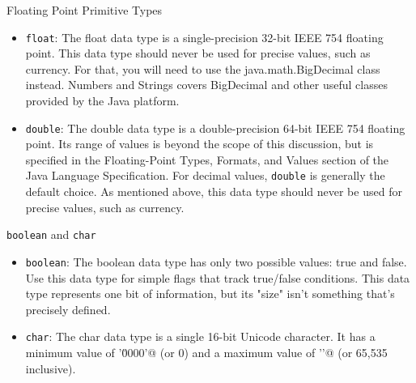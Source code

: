 \documentclass{beamer}
\begin{document}
\begin{frame}[fragile]{Floating Point Primitive Types}


\begin{itemize}
\item {\tt float}: The float data type is a single-precision 32-bit IEEE 754 floating point. This data type should never be used for precise values, such as currency. For that, you will need to use the java.math.BigDecimal class instead. Numbers and Strings covers BigDecimal and other useful classes provided by the Java platform.

\item {\tt double}: The double data type is a double-precision 64-bit IEEE 754 floating point. Its range of values is beyond the scope of this discussion, but is specified in the Floating-Point Types, Formats, and Values section of the Java Language Specification. For decimal values, {\tt double} is generally the default choice. As mentioned above, this data type should never be used for precise values, such as currency.
\end{itemize}

\end{frame}

\begin{frame}[fragile]{{\tt boolean} and {\tt char}}


\begin{itemize}
\item {\tt boolean}: The boolean data type has only two possible values: true and false. Use this data type for simple flags that track true/false conditions. This data type represents one bit of information, but its "size" isn't something that's precisely defined.

\item {\tt char}: The char data type is a single 16-bit Unicode character. It has a minimum value of \verb@'\u0000'@ (or 0) and a maximum value of \verb@'\uffff'@ (or 65,535 inclusive).
\end{itemize}


\end{frame}
\end{document}
